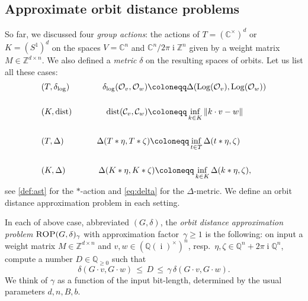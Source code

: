 \documentclass[a4paper,USenglish,cleveref,numberwithinsect]{lipics-v2021}
\DeclareMathOperator{\ii}{i}
\DeclareMathOperator{\Log}{Log}
\DeclareMathOperator{\dist}{dist}
\newcommand{\distLD}{\delta_{\log}}
\newcommand{\QQ}{\mathbb{Q}}
\newcommand{\CC}{\mathbb{C}}
\newcommand{\ZZ}{\mathbb{Z}}
\newcommand{\OO}{\ensuremath{\mathcal{O}}}
\newcommand{\KK}{\ensuremath{\mathcal{C}}}
\numberwithin{equation}{section}
\begin{document}
\subsection{Approximate orbit distance problems}\label{se:ADP}
So far, we discussed four {\em group actions}:
the actions of $T=(\CC^\times)^d$ or $K=(S^1)^d$ on the spaces
$V=\CC^n$ and $\CC^n/2\pi\ii\ZZ^n$ given by a weight matrix $M\in\ZZ^{d\times n}$.
We also defined a {\em metric} $\delta$ on the resulting spaces of orbits.
Let us list all these cases:
\[
\begin{split}
&(T,\distLD) \qquad \qquad \distLD(\OO_v,\OO_w) \coloneqq \Delta(\Log(\OO_v),\Log(\OO_w))\\
  \vspace{1.5mm}\\
  &(K,\dist) \qquad\qquad \dist(\KK_v,\KK_w) \coloneqq \inf_{k\in K}\Vert k\cdot v-w\Vert\\
 \vspace{1.5mm}\\
  &(T,\Delta) \qquad\qquad \Delta( T\ast \eta, T\ast\zeta ) \coloneqq \inf_{t\in T}\Delta(t\ast\eta, \zeta)\\
 \vspace{1.5mm}\\
 &(K,\Delta) \qquad\qquad \Delta(K\ast\eta,K\ast\zeta)\coloneqq \inf_{k\in K}\Delta(k\ast\eta, \zeta),
\end{split}
\]
see \cref{def:ast} for the $\ast$-action and \cref{eq:delta} for the $\Delta$-metric.
We define an orbit distance approximation problem in each setting.

\begin{definition}
\label{def:gaprop}
In each of above case, abbreviated $(G,\delta)$,
the \textit{orbit distance approximation problem} $\textsc{ROP}(G,\delta)_\gamma$
with approximation factor~$\gamma\geq1$ is the following:
on input a weight matrix $M\in\ZZ^{d\times n}$ and
$v,w \in (\QQ(\ii)^\times)^n$, resp.\ $\eta,\zeta\in\QQ^n+2\pi\ii\QQ^n$,
compute a number $D\in\QQ_{\geq 0}$ such that
\[
  \delta( G\cdot v, G\cdot w ) \, \leq \, D \, \leq  \, \gamma \, \delta(G\cdot v, G\cdot w).
\]
We think of $\gamma$ as a function of the input bit-length, determined by the usual
parameters $d,n,B,b$.
\end{definition}
\end{document}
